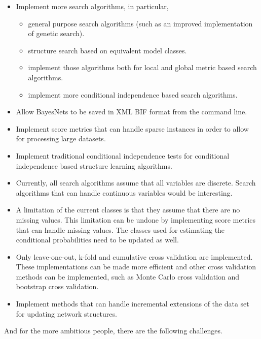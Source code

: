 \documentclass{article}
\begin{document}
\begin{itemize}
\item Implement more search algorithms, in particular, 
\begin{itemize}
\item general purpose search algorithms (such as an improved implementation of 
genetic search).
\item structure search based on equivalent model classes.
\item implement those algorithms both for local and global metric based search algorithms.
\item implement more conditional independence based search algorithms.
\end{itemize}

\item Allow BayesNets to be saved in XML BIF format from the command line.

\item Implement score metrics that can handle sparse instances in order to allow 
for processing large datasets.

\item Implement traditional conditional independence tests for conditional
independence based structure learning algorithms.

\item Currently, all search algorithms assume that all variables are discrete.
Search algorithms that can handle continuous variables would be interesting.

\item A limitation of the current classes is that they assume that there
are no missing values. This limitation can be undone by implementing score metrics 
that can handle missing values.
The classes used for estimating the conditional probabilities need to be updated
as well.

\item Only leave-one-out, k-fold and cumulative cross validation are implemented.
These implementations can be made more efficient and other cross validation methods
can be implemented, such as Monte Carlo cross validation and bootstrap cross
validation.

\item Implement methods that can handle incremental extensions of the data set for
updating network structures.

\end{itemize}

And for the more ambitious people, there are the following challenges.
\end{document}
